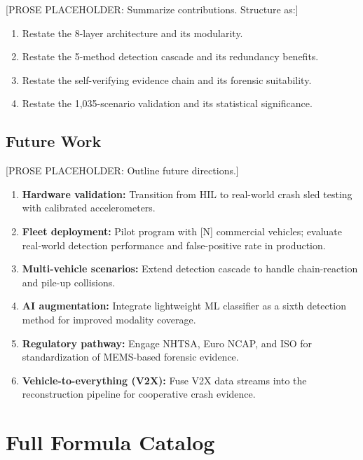\documentclass[conference,twocolumn]{IEEEtran}
\begin{document}
[PROSE PLACEHOLDER: Summarize contributions. Structure as:]
\begin{enumerate}
  \item Restate the 8-layer architecture and its modularity.
  \item Restate the 5-method detection cascade and its redundancy benefits.
  \item Restate the self-verifying evidence chain and its forensic suitability.
  \item Restate the 1,035-scenario validation and its statistical significance.
\end{enumerate}

\subsection{Future Work}

[PROSE PLACEHOLDER: Outline future directions.]

\begin{enumerate}
  \item \textbf{Hardware validation:} Transition from HIL to real-world crash sled testing with calibrated accelerometers.
  \item \textbf{Fleet deployment:} Pilot program with [N] commercial vehicles; evaluate real-world detection performance and false-positive rate in production.
  \item \textbf{Multi-vehicle scenarios:} Extend detection cascade to handle chain-reaction and pile-up collisions.
  \item \textbf{AI augmentation:} Integrate lightweight ML classifier as a sixth detection method for improved modality coverage.
  \item \textbf{Regulatory pathway:} Engage NHTSA, Euro NCAP, and ISO for standardization of MEMS-based forensic evidence.
  \item \textbf{Vehicle-to-everything (V2X):} Fuse V2X data streams into the reconstruction pipeline for cooperative crash evidence.
\end{enumerate}




\appendix

\section{Full Formula Catalog}
\label{app:formulas}
\end{document}
